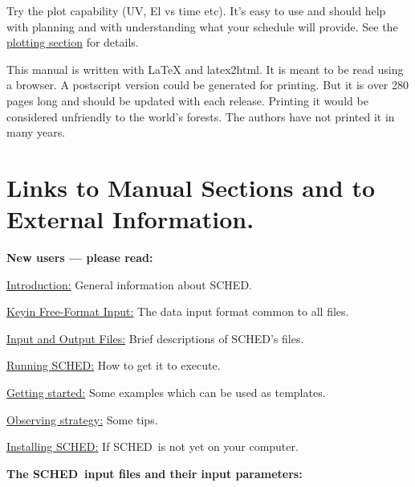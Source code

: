 \documentclass{report}
\newcommand{\sched}{{\sc SCHED}}
\newcommand{\schedb}{{\sc SCHED~}}
\begin{document}
\begin{list}{}{\parsep 0.5em \itemsep 0.5em }
\item Try the plot capability (UV, El vs time etc).  It's easy to
use and should help with planning and with understanding what your
schedule will provide.  See the 
{\hyperref[SEC:PLOT]{plotting section}}
for details.

\item This manual is written with LaTeX and latex2html.  It is meant
to be read using a browser.  A postscript version could be generated
for printing.  But it is over 280 pages long and should be updated with
each release.  Printing it would be considered unfriendly to the
world's forests.  The authors have not printed it in many years.

\end{list}

\section{\label{SEC:LINKS}Links to Manual Sections and to
External Information.}

{\bf New users --- please read:}

\begin{list}{}{\parsep 0em  \itemsep 0em }
\item 
{\hyperref[SEC:INTRO]{Introduction:}} General information about \sched.

\item 
{\hyperref[SEC:KEYIN]{Keyin Free-Format Input:}} The data input format
common to all files.

\item 
{\hyperref[SEC:FILES]{Input and Output Files:}} Brief descriptions
of \sched's files.

\item 
{\hyperref[SEC:RUNSCHED]{Running \sched:}} How to get it to execute.

\item 
{\hyperref[SEC:EXAMPLES]{Getting started:}} Some examples which can be
used as templates.

\item 
{\hyperref[SSEC:STRATEGY]{Observing strategy:}} Some tips.

\item 
{\hyperref[SEC:INSTALL]{Installing \sched:}} If \schedb is not yet on your
computer.

\end{list}


{\bf The \sched\ input files and their input parameters:}
\end{document}
